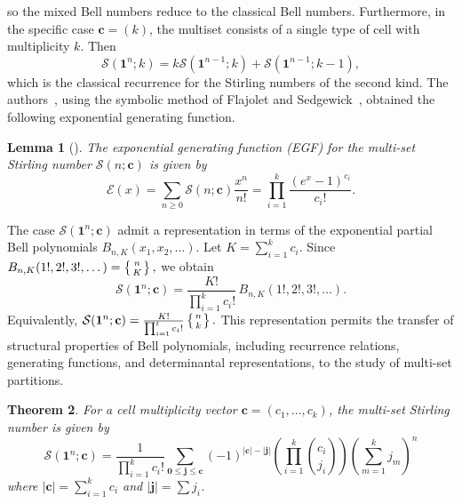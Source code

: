 \documentclass[12pt]{amsart}
\newtheorem{theorem}{Theorem}[section]
\newtheorem{lemma}[theorem]{Lemma}
\theoremstyle{definition}
\begin{document}
 so the mixed Bell numbers reduce to the classical Bell numbers.
Furthermore, in the specific case $\mathbf{c} = (k)$, the multiset consists of a single type of cell with multiplicity $k$. Then
\begin{equation*}
    \mathcal{S}(\mathbf{1}^n; k) = k \mathcal{S}(\mathbf{1}^{n-1}; k) + \mathcal{S}(\mathbf{1}^{n-1}; k-1),
\end{equation*}
which is the classical recurrence for the Stirling numbers of the second kind. The authors~\cite{Yaqubi2019}, using the symbolic method of Flajolet and Sedgewick~\cite{flajolet1980}, obtained the following exponential generating function.
\begin{lemma}[\cite{Yaqubi2019}]
\label{Gef}
The exponential generating function (EGF) for the multi-set Stirling number $\mathcal{S}(n; \mathbf{c})$ is given by
\begin{equation*}
    \mathcal{E}(x) = \sum_{n \ge 0} \mathcal{S}(n; \mathbf{c}) \frac{x^n}{n!} = \prod_{i=1}^k \frac{(e^x - 1)^{c_i}}{c_i!}.
\end{equation*}
\end{lemma}
The case $\mathcal{S}(\mathbf{1}^n;\mathbf{c})$ admit a representation in terms of the exponential partial Bell polynomials $B_{n,K}(x_1,x_2,\dots)$. Let
$K=\sum_{i=1}^k c_i.$ Since
$B_{n,K}(1!,2!,3!,\dots)
=
\left\{\genfrac{}{}{0pt}{}{n}{K}\right\},$ we obtain
\begin{equation*}
\mathcal{S}(\mathbf{1}^n;\mathbf{c})
=
\frac{K!}{\prod_{i=1}^k c_i!}
\,B_{n,K}(1!,2!,3!,\dots).
\end{equation*}
Equivalently,
$\mathcal{S}(\mathbf{1}^n;\mathbf{c})
=\frac{K!}{\prod_{i=1}^t c_i!}\left\{\genfrac{}{}{0pt}{}{n}{k}\right\}.$
This representation permits the transfer of structural properties of Bell polynomials, including recurrence relations, generating functions, and determinantal representations, to the study of multi-set partitions.
\begin{theorem}\label{Inclusion-Exclusion Formula}
For a cell multiplicity vector $\mathbf{c} = (c_1, \dots, c_k)$, the multi-set Stirling number is given by
\begin{equation*}
\mathcal{S}(\mathbf{1}^n; \mathbf{c}) = \frac{1}{\prod_{i=1}^k c_i!} \sum_{\mathbf{0} \le \mathbf{j} \le \mathbf{c}} (-1)^{|\mathbf{c}| - |\mathbf{j}|} \left( \prod_{i=1}^k \binom{c_i}{j_i} \right) \left( \sum_{m=1}^k j_m \right)^n
\end{equation*}
where $|\mathbf{c}| = \sum_{i=1}^k c_i$ and $|\mathbf{j}| = \sum j_i$.
\end{theorem}
\end{document}
